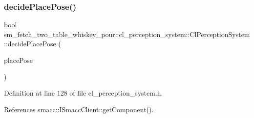\subsubsection{\texorpdfstring{decide\+Place\+Pose()}{decidePlacePose()}}
{\footnotesize\ttfamily \hyperlink{classbool}{bool} sm\+\_\+fetch\+\_\+two\+\_\+table\+\_\+whiskey\+\_\+pour\+::cl\+\_\+perception\+\_\+system\+::\+Cl\+Perception\+System\+::decide\+Place\+Pose (\begin{DoxyParamCaption}\item[{geometry\+\_\+msgs\+::\+Pose\+Stamped \&}]{place\+Pose }\end{DoxyParamCaption})\hspace{0.3cm}{\ttfamily [inline]}}



Definition at line 128 of file cl\+\_\+perception\+\_\+system.\+h.



References smacc\+::\+I\+Smacc\+Client\+::get\+Component().


